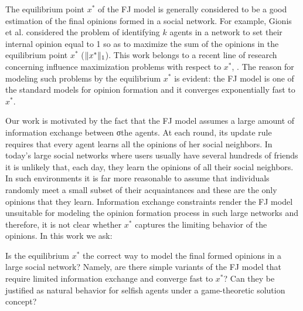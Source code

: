 The equilibrium point $x^*$ of the FJ model is generally considered to be a
good estimation of the final opinions formed in a social network. For example,
Gionis et al.  \cite{GTT13} considered the problem of identifying $k$ agents in
a network to set their internal opinion equal to 1 so as to maximize the sum
of the opinions in the equilibrium point $x^*$ ($\norm{1}{x^*}$). This work
belongs to a recent line of research concerning influence maximization problems
with respect to $x^*$, \cite{GTT13,AKPT18,MMT17}. The reason for modeling such
problems by the equilibrium $x^*$ is evident: the FJ model is one of the
standard models for opinion formation and it converges exponentially fast to
$x^*$.

Our work is motivated by the fact that the FJ model assumes a large amount of
information exchange between σthe agents. At each round, its update rule
requires that every agent learns all the opinions of her social neighbors.  In
today's large social networks where users usually have several hundreds of
friends it is unlikely that, each day, they learn the opinions of all their
social neighbors.  In such environments it is far more reasonable to assume
that individuals randomly meet a small subset of their acquaintances and these
are the only opinions that they learn.  Information exchange constraints
render the FJ model unsuitable for modeling the opinion formation process in
such large networks and therefore, it is not clear whether $x^*$ captures the
limiting behavior of the opinions. In this work we ask:
%
\begin{question}\label{q:motivation1}
  Is the equilibrium $x^*$ the correct way to model the final formed opinions
  in a large social network? Namely, are there simple variants of the FJ model
  that require limited information exchange and converge fast to $x^*$? Can
  they be justified as natural behavior for selfish agents under a
  game-theoretic solution concept?
\end{question}

